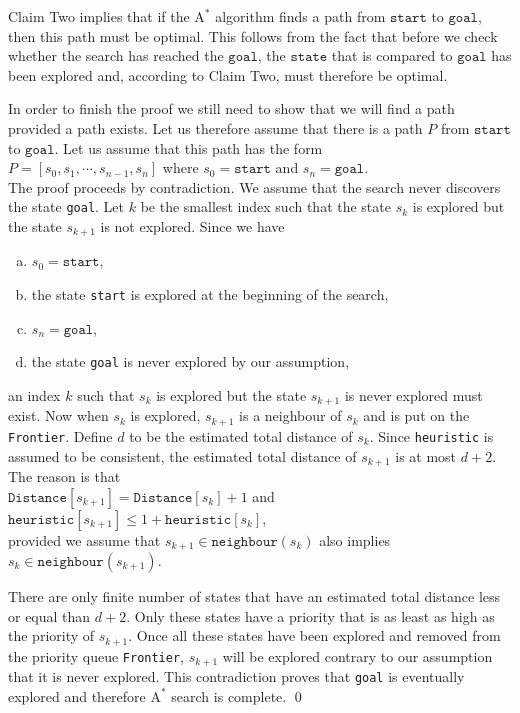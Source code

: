 \noindent
Claim Two implies that if the $\textrm{A}^*$ algorithm finds a path from $\texttt{start}$ to $\texttt{goal}$, then this
path must be optimal.  This follows from the fact that before we check whether the search has reached the
$\texttt{goal}$, the $\texttt{state}$ that is compared to $\texttt{goal}$ has been explored and, according to
Claim Two, must therefore be optimal.  

In order to finish the proof we still need to show that we will find a path provided a path exists.  Let us
therefore assume that there is a path $P$ from $\texttt{start}$ to $\texttt{goal}$.  Let us assume that this path has the form 
\\[0.2cm]
\hspace*{1.3cm}
$P = [s_0, s_1, \cdots, s_{n-1}, s_n]$ \quad where $s_0 = \texttt{start}$ and $s_n = \texttt{goal}$.
\\[0.2cm]
The proof proceeds by contradiction.  We assume that the search never discovers the state \texttt{goal}.
Let $k$ be the smallest index such that the state $s_k$ is explored but the state $s_{k+1}$ is not
explored.  Since we have
\begin{enumerate}[(a)]
\item $s_0 = \texttt{start}$,
\item the state \texttt{start} is explored at the beginning of the search,
\item $s_n = \texttt{goal}$,
\item the state \texttt{goal} is never explored by our assumption,
\end{enumerate}
an index $k$ such that  $s_k$ is explored but the state $s_{k+1}$ is never explored must exist.  Now
when $s_k$ is explored, $s_{k+1}$ is a neighbour of $s_k$ and is put on the \texttt{Frontier}.
Define $d$ to be the estimated total distance of $s_k$.
Since \texttt{heuristic} is assumed to be consistent, the estimated total distance of $s_{k+1}$ is
at most $d+2$.  The reason is that 
\\[0.2cm]
\hspace*{1.3cm}
$\texttt{Distance}[s_{k+1}] = \texttt{Distance}[s_k] + 1$ \quad and \quad 
$\texttt{heuristic}[s_{k+1}] \leq 1 + \texttt{heuristic}[s_k]$,
\\[0.2cm]
provided we assume that $s_{k+1} \in \texttt{neighbour}(s_k)$ also implies $s_{k} \in
\texttt{neighbour}(s_{k+1})$.  

There are only finite number of states that have an estimated total distance less or
equal than $d+2$.  Only these states have a priority that is as least as high as the priority of
$s_{k+1}$.   Once all these states have been explored and removed from the priority queue
\texttt{Frontier}, $s_{k+1}$ will be explored contrary to our 
assumption that it is never explored.  This contradiction proves that \texttt{goal} is eventually
explored and therefore $\mathrm{A}^*$ search is complete.  \qed




